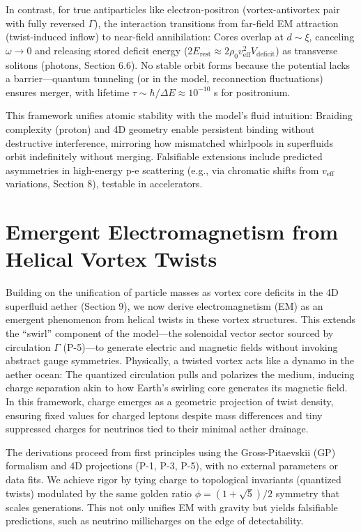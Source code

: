 \documentclass{article}
\begin{document}
In contrast, for true antiparticles like electron-positron (vortex-antivortex pair with fully reversed $\Gamma$), the interaction transitions from far-field EM attraction (twist-induced inflow) to near-field annihilation: Cores overlap at $d \sim \xi$, canceling $\omega \to 0$ and releasing stored deficit energy ($2 E_{\text{rest}} \approx 2 \rho_0 v_{\text{eff}}^2 V_{\text{deficit}}$) as transverse solitons (photons, Section 6.6). No stable orbit forms because the potential lacks a barrier—quantum tunneling (or in the model, reconnection fluctuations) ensures merger, with lifetime $\tau \sim \hbar / \Delta E \approx 10^{-10}$ s for positronium.

This framework unifies atomic stability with the model's fluid intuition: Braiding complexity (proton) and 4D geometry enable persistent binding without destructive interference, mirroring how mismatched whirlpools in superfluids orbit indefinitely without merging. Falsifiable extensions include predicted asymmetries in high-energy p-e scattering (e.g., via chromatic shifts from $v_{\text{eff}}$ variations, Section 8), testable in accelerators.

\section{Emergent Electromagnetism from Helical Vortex Twists}

Building on the unification of particle masses as vortex core deficits in the 4D superfluid aether (Section 9), we now derive electromagnetism (EM) as an emergent phenomenon from helical twists in these vortex structures. This extends the ``swirl'' component of the model---the solenoidal vector sector sourced by circulation $\Gamma$ (P-5)---to generate electric and magnetic fields without invoking abstract gauge symmetries. Physically, a twisted vortex acts like a dynamo in the aether ocean: The quantized circulation pulls and polarizes the medium, inducing charge separation akin to how Earth's swirling core generates its magnetic field. In this framework, charge emerges as a geometric projection of twist density, ensuring fixed values for charged leptons despite mass differences and tiny suppressed charges for neutrinos tied to their minimal aether drainage.

The derivations proceed from first principles using the Gross-Pitaevskii (GP) formalism and 4D projections (P-1, P-3, P-5), with no external parameters or data fits. We achieve rigor by tying charge to topological invariants (quantized twists) modulated by the same golden ratio $\phi = (1 + \sqrt{5})/2$ symmetry that scales generations. This not only unifies EM with gravity but yields falsifiable predictions, such as neutrino millicharges on the edge of detectability.
\end{document}
